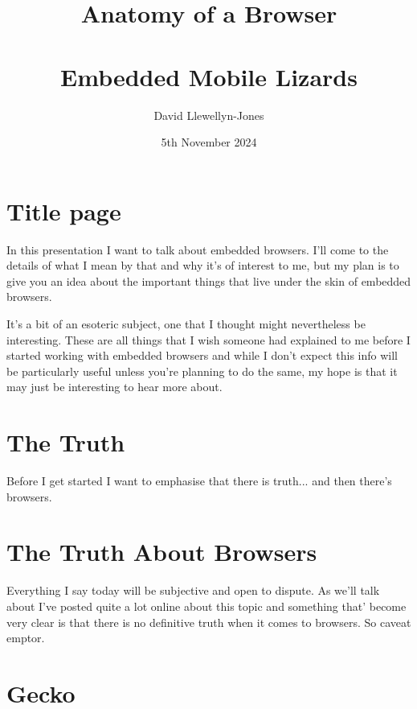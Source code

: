 \documentclass{article}
\begin{document}
\title{Anatomy of a Browser\\ \large \ \\Embedded Mobile Lizards}
\author{David Llewellyn-Jones}
\date{5th November 2024}


\maketitle

\section{Title page}
In this presentation I want to talk about embedded browsers. I'll come to the details of what I mean by that and why it's of interest to me, but my plan is to give you an idea about the important things that live under the skin of embedded browsers.

It's a bit of an esoteric subject, one that I thought might nevertheless be interesting. These are all things that I wish someone had explained to me before I started working with embedded browsers and while I don't expect this info will be particularly useful unless you're planning to do the same, my hope is that it may just be interesting to hear more about.


\section{The Truth}

Before I get started I want to emphasise that there is truth... and then there's browsers.


\section{The Truth About Browsers}

Everything I say today will be subjective and open to dispute. As we'll talk about I've posted quite a lot online about this topic and something that' become very clear is that there is no definitive truth when it comes to browsers. So caveat emptor.


\section{Gecko}
\end{document}

